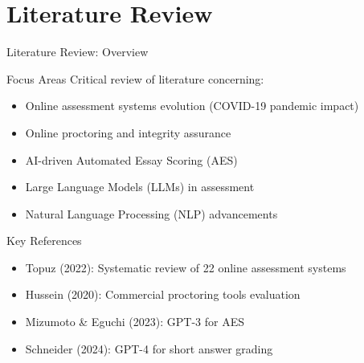 \section{Literature Review}

\begin{frame}{Literature Review: Overview}
    \begin{block}{Focus Areas}
        Critical review of literature concerning:
        \begin{itemize}
            \item Online assessment systems evolution (COVID-19 pandemic impact)
            \item Online proctoring and integrity assurance
            \item AI-driven Automated Essay Scoring (AES)
            \item Large Language Models (LLMs) in assessment
            \item Natural Language Processing (NLP) advancements
        \end{itemize}
    \end{block}
    
    \begin{block}{Key References}
        \begin{itemize}
            \item Topuz (2022): Systematic review of 22 online assessment systems
            \item Hussein (2020): Commercial proctoring tools evaluation
            \item Mizumoto \& Eguchi (2023): GPT-3 for AES
            \item Schneider (2024): GPT-4 for short answer grading
        \end{itemize}
    \end{block}
\end{frame}

